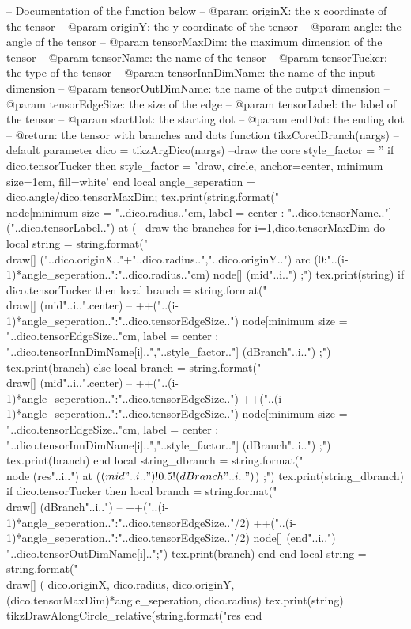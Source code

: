 \begin{luacode*}
	-- Documentation of the function below
	-- @param originX: the x coordinate of the tensor
	-- @param originY: the y coordinate of the tensor
	-- @param angle: the angle of the tensor
	-- @param tensorMaxDim: the maximum dimension of the tensor
	-- @param tensorName: the name of the tensor
	-- @param tensorTucker: the type of the tensor
	-- @param tensorInnDimName: the name of the input dimension
	-- @param tensorOutDimName: the name of the output dimension
	-- @param tensorEdgeSize: the size of the edge
	-- @param tensorLabel: the label of the tensor
	-- @param startDot: the starting dot
	-- @param endDot: the ending dot
	-- @return: the tensor with branches and dots
	function tikzCoredBranch(nargs)
	 	--default parameter
	 	dico = tikzArgDico(nargs)
		--draw the core
	 	style_factor = ''
	 	if dico.tensorTucker then
	 	  style_factor = 'draw, circle, anchor=center, minimum size=1cm, fill=white'
	 	end
	 	local angle_seperation = dico.angle/dico.tensorMaxDim;
	 	tex.print(string.format("\\node[minimum size = "..dico.radius.."cm, label = center : "..dico.tensorName.."] ("..dico.tensorLabel..") at (%
	 	--draw the branches
	 	for i=1,dico.tensorMaxDim do
	 		local string = string.format("\\draw[] ("..dico.originX.."+"..dico.radius..","..dico.originY..") arc (0:"..(i-1)*angle_seperation..":"..dico.radius.."cm) node[] (mid"..i..") {};")
			tex.print(string)
			if dico.tensorTucker then
				local branch = string.format("\\draw[] (mid"..i..".center) -- ++("..(i-1)*angle_seperation..":"..dico.tensorEdgeSize..") node[minimum size = "..dico.tensorEdgeSize.."cm, label = center : "..dico.tensorInnDimName[i]..","..style_factor.."] (dBranch"..i..") {};")
				tex.print(branch)
			else
				local branch = string.format("\\draw[] (mid"..i..".center) -- ++("..(i-1)*angle_seperation..":"..dico.tensorEdgeSize..") ++("..(i-1)*angle_seperation..":"..dico.tensorEdgeSize..") node[minimum size = "..dico.tensorEdgeSize.."cm, label = center : "..dico.tensorInnDimName[i]..","..style_factor.."] (dBranch"..i..") {};")
				tex.print(branch)
			end
	 		local string_dbranch = string.format("\\node (res"..i..") at ($(mid"..i..")!0.5!(dBranch"..i..")$) {};")
			tex.print(string_dbranch)
			if dico.tensorTucker then
			  local branch = string.format("\\draw[] (dBranch"..i..") -- ++("..(i-1)*angle_seperation..":"..dico.tensorEdgeSize.."/2) ++("..(i-1)*angle_seperation..":"..dico.tensorEdgeSize.."/2) node[] (end"..i..") {"..dico.tensorOutDimName[i].."};")
			  tex.print(branch)
			end
	 	end
		local string = string.format("\\draw[] (%
		dico.originX, dico.radius, dico.originY, (dico.tensorMaxDim)*angle_seperation, dico.radius)
		tex.print(string)
		tikzDrawAlongCircle_relative(string.format("res%
	end
  

\end{luacode*}

